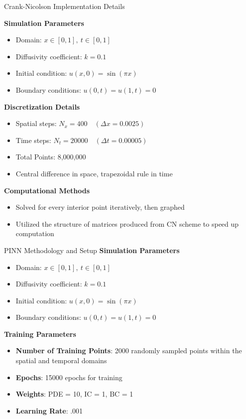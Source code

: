 \documentclass{beamer}
\begin{document}
\begin{frame}{Crank-Nicolson Implementation Details}

\vspace{0.3cm}
\textbf{Simulation Parameters}
\begin{itemize}
    \item Domain: \( x \in [0, 1],\ t \in [0, 1] \)
    \item Diffusivity coefficient: \( k = 0.1 \)
    \item Initial condition: \( u(x, 0) = \sin(\pi x) \)
    \item Boundary conditions: \( u(0,t) = u(1,t) = 0 \)
\end{itemize}

\vspace{0.3cm}
\textbf{Discretization Details}
\begin{itemize}
    \item Spatial steps: \( N_x = 400\quad (\Delta x = 0.0025) \)
    \item Time steps: \( N_t = 20000\quad (\Delta t = 0.00005) \)
    \item Total Points: 8,000,000
    \item Central difference in space, trapezoidal rule in time
\end{itemize}

\vspace{0.3cm}
\textbf{Computational Methods}
\begin{itemize}
    \item Solved for every interior point iteratively, then graphed
    \item Utilized the structure of matrices produced from CN scheme to speed up computation
\end{itemize}

\end{frame}

\begin{frame}{PINN Methodology and Setup}
    \textbf{Simulation Parameters}
    \begin{itemize}
        \item Domain: \( x \in [0, 1],\ t \in [0, 1] \)
        \item Diffusivity coefficient: \( k = 0.1 \)
        \item Initial condition: \( u(x, 0) = \sin(\pi x) \)
        \item Boundary conditions: \( u(0,t) = u(1,t) = 0 \)
    \end{itemize}
    \vspace{.5cm}
    \textbf{Training Parameters}
    \begin{itemize}
        \item \textbf{Number of Training Points}: 2000 randomly sampled points within the spatial and temporal domains
        \item \textbf{Epochs}: 15000 epochs for training
        \item \textbf{Weights}: PDE = 10, IC = 1, BC = 1
        \item \textbf{Learning Rate}: .001
    \end{itemize}
    
\end{frame}
\end{document}
